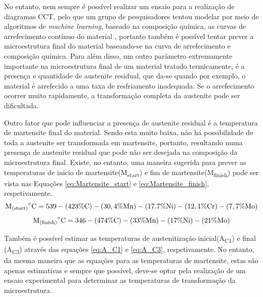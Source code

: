 \par
No entanto, nem sempre é possível realizar um ensaio para a realização de diagramas CCT, pelo que um grupo de pesquisadores tentou modelar por meio de algoritmos de \textit{machine learning}, baseado na composição química, as curvas de arrefecimento contínuo do material \cite{Martin2020}, portanto também é possível tentar prever a microestrutura final do material baseando-se na curva de arrefecimento e composição química. Para além disso, um outro parâmetro extremamente importante na microestrutura final de um material tratado termicamente, é a presença e quantidade de austenite residual, que da-se quando por exemplo, o material é arrefecido a uma taxa de resfriamento inadequada. Se o arrefecimento ocorrer muito rapidamente, a transformação completa da austenite pode ser dificultada.
\par
Outro fator que pode influenciar a presença de austenite residual é a temperatura de martensite final do material. Sendo esta muito baixa, não há possibilidade de toda a austenite ser transformada em martensite, portanto, resultando numa presença de austenite residual que pode não ser desejada na composição da microestrutura final. Existe, no entanto, uma maneira sugerida para prever as temperaturas de inicio de martensite(M\textsubscript{start}) e fim de martensite(M\textsubscript{finish}) pode ser vista nas Equações \ref{eq:Martensite_start} e \ref{eq:Martensite_finish}, respetivamente\cite{Honeycombe1995}.
\begin{equation}
    \label{eq:Martensite_start}
    \mathrm{M\textsubscript{(start)}}^{\circ}\mathrm{C} = 539-(423\%\mathrm{C})-(30,4\%\mathrm{Mn})-(17.7\%\mathrm{Ni})-(12,1\%\mathrm{Cr})-(7,7\%\mathrm{Mo})
\end{equation}
\begin{equation}
    \label{eq:Martensite_finish}
    \mathrm{M\textsubscript{(finish)}}^{\circ}\mathrm{C} = 346 - (474\%\mathrm{C}) - (33\%\mathrm{Mn}) - (17\%\mathrm{Ni}) - (21\%\mathrm{Mo})
\end{equation}
\par
Também é possível estimar as temperaturas de austenitização inicial(A\textsubscript{C1}) e final (A\textsubscript{C3}) através das equações \ref{eq:A_C1} e \ref{eq:A_C3}, respetivamente\cite{Platl2020}. No entanto, da mesma maneira que as equações para as temperaturas de martensite, estas são apenas estimativas e sempre que possível, deve-se optar pela realização de um ensaio experimental para determinar as temperaturas de transformação da microestrutura.
